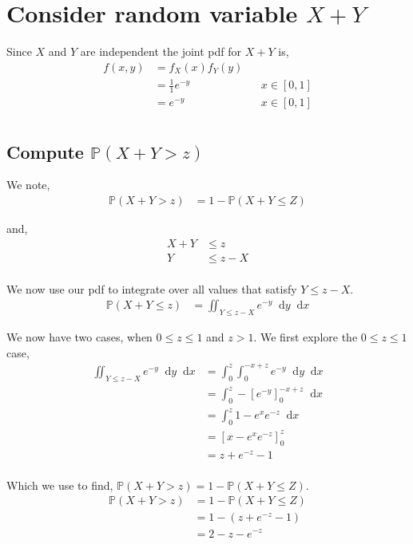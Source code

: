 \documentclass{article}
\newcommand{\diff}{\mathop{}\!\mathrm{d}}
\newcommand{\prob}{\mathbb{P}}
\begin{document}
\section{Consider random variable $X+Y$}
Since $X$ and $Y$ are independent the joint pdf for $X+Y$ is,
\begin{align*}
    f(x,y) &= f_X(x) f_Y(y) \\
    &= \frac{1}{1} e^{-y} && x \in [0,1] \\
    &= e^{-y} && x \in [0,1] \\
\end{align*}

\subsection{Compute $\prob(X+Y>z)$}
We note,
\begin{align*}
    \prob(X+Y>z) &= 1 - \prob(X+Y \leq Z)
\end{align*}

and,
\begin{align*}
    X + Y &\leq z \\
    Y &\leq z - X \\
\end{align*}

We now use our pdf to integrate over all values that satisfy $Y \leq z - X$.
\begin{align*}
    \prob(X+Y \leq z) &= \iint_{Y \leq z - X} e^{-y} \diff y \diff x
\end{align*}

We now have two cases, when $0 \leq z \leq 1$ and $z > 1$.
We first explore the $0 \leq z \leq 1$ case,
\begin{align*}
    \iint_{Y \leq z - X} e^{-y} \diff y \diff x
    &= \int_0^z \int_0^{-x+z} e^{-y} \diff y \diff x \\
    &= \int_0^z - \left[ e^{-y} \right]_0^{-x+z} \diff x \\
    &= \int_0^z 1 - e^{x} e^{-z} \diff x \\
    &= \left[ x - e^{x} e^{-z} \right]_0^z \\
    &= z + e^{-z} - 1 \\
\end{align*}

Which we use to find, $\prob(X+Y>z) = 1 - \prob(X+Y \leq Z)$.
\begin{align*}
    \prob(X+Y>z) &= 1 - \prob(X+Y \leq Z) \\
    &= 1 - (z + e^{-z} - 1) \\
    &= 2 - z - e^{-z}
\end{align*}
\end{document}

